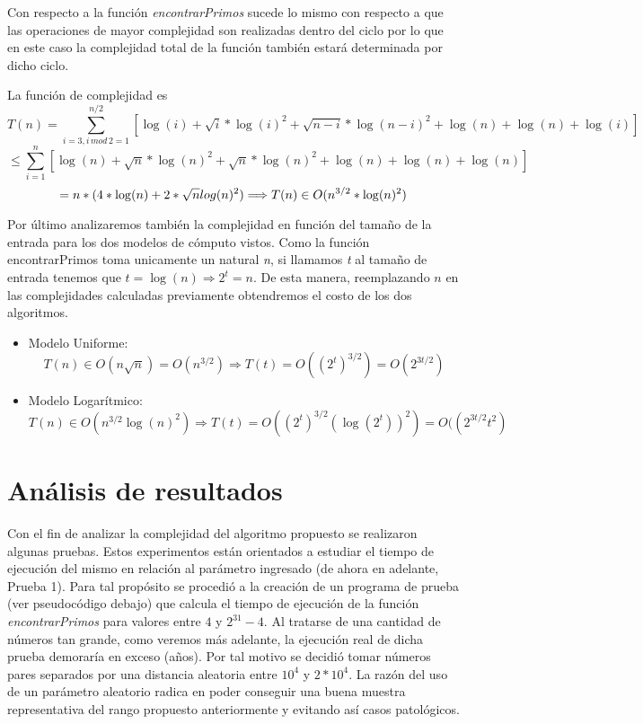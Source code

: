 \documentclass[a4paper,10pt] {article}
\begin{document}
\bigskip

Con respecto a la funci\'on \textit{encontrarPrimos} sucede lo mismo con respecto a que
las operaciones de mayor complejidad son realizadas dentro del ciclo por lo que
en este caso la complejidad total de la funci\'on tambi\'en estar\'a determinada
por dicho ciclo.

La funci\'on de complejidad es 
$$ T(n) = \sum_{i=3,i\,mod\,2=1}^{n/2}
[\log(i)+\sqrt{i}*\log(i)^{2}+\sqrt{n-i}*\log(n-i)^{2}+\log(n)+\log(n)+\log(i)] $$
$$ \leq \sum_{i=1}^{n} [\log(n)+\sqrt{n}*\log(n)^{2}+\sqrt{n}*\log(n)^{2}+\log(n)+\log(n)+\log(n)] $$
$$ = n*(4*\log(n)+2*\sqrt{n}\*log(n)^{2}) \Longrightarrow T(n) \in O(n^{3/2}*\log(n)^{2}) $$

\bigskip

Por \'ultimo analizaremos tambi\'en la complejidad en funci\'on del tama\~{n}o
de la entrada para los dos modelos de c\'omputo vistos. Como la funci\'on
encontrarPrimos toma unicamente un natural \textit{n}, si llamamos \textit{t} al
tama\~{n}o de entrada tenemos que $t = \log(n) \Longrightarrow 2^{t} = n$. De
esta manera, reemplazando $n$ en las complejidades calculadas previamente
obtendremos el costo de los dos algoritmos.

\begin{itemize}
\item Modelo Uniforme: 
$$T(n) \in O(n\sqrt{n}) = O(n^{3/2}) \Longrightarrow T(t) = O((2^{t})^{3/2}) =
O(2^{3t/2})$$
\item Modelo Logar\'itmico: 
$$T(n) \in O(n^{3/2}\log(n)^{2}) \Longrightarrow T(t) =
O((2^{t})^{3/2}(\log(2^{t}))^{2}) = O((2^{3t/2}t^{2})$$
\end{itemize}

\section*{An\'alisis de resultados}

Con el fin de analizar la complejidad del algoritmo propuesto se realizaron algunas pruebas. Estos experimentos están orientados a estudiar el tiempo de ejecución del mismo en relaci\'on al par\'ametro ingresado (de ahora en adelante, Prueba 1). Para tal prop\'osito se procedi\'o a la creaci\'on de un programa de prueba (ver pseudoc\'odigo debajo) que calcula el tiempo de ejecuci\'on de la funci\'on \textit{encontrarPrimos} para valores entre $4$ y $2^{31}-4$. Al tratarse de una cantidad de n\'umeros tan grande, como veremos m\'as adelante, la ejecuci\'on real de dicha prueba demorar\'ia en exceso (a\~{n}os). Por tal motivo se decidi\'o tomar n\'umeros pares separados por una distancia aleatoria entre $10^{4}$ y $2*10^{4}$. La raz\'on del uso de un par\'ametro aleatorio radica en poder conseguir una buena muestra representativa del rango propuesto anteriormente y evitando as\'i casos patol\'ogicos.
\end{document}
